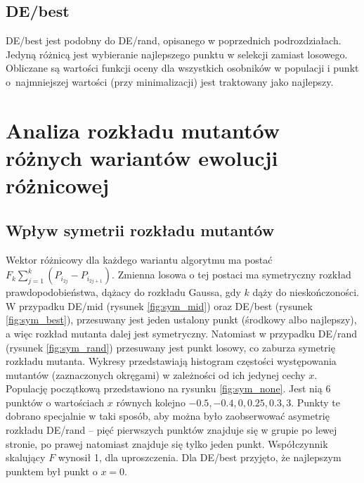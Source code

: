 \documentclass[a4paper,onecolumn,oneside,12pt,wide,floatssmall]{mwrep}
\theoremstyle{definition}
\theoremstyle{plain}%
\theoremstyle{remark}
\begin{document}
\subsection{DE/best}

DE/best jest podobny do DE/rand, opisanego w poprzednich podrozdziałach.
Jedyną różnicą jest wybieranie najlepszego punktu w selekcji zamiast losowego. Obliczane są wartości
funkcji oceny dla wszystkich osobników w populacji i punkt o~najmniejszej wartości (przy minimalizacji)
jest traktowany jako najlepszy.

\section{Analiza rozkładu mutantów różnych wariantów ewolucji różnicowej}

\subsection{Wpływ symetrii rozkładu mutantów}

Wektor różnicowy dla każdego wariantu algorytmu ma postać
$ F_k\sum\limits_{j=1}^k (P_{i_{2j}} - P_{i_{2j+1}}) $. Zmienna losowa o tej postaci
ma symetryczny rozkład prawdopodobieństwa, dążacy do rozkładu Gaussa, gdy $k$ dąży do 
nieskończoności. W przypadku DE/mid (rysunek \ref{fig:sym_mid}) 
oraz DE/best (rysunek \ref{fig:sym_best}),
przesuwany jest jeden ustalony punkt (środkowy albo najlepszy), 
a więc rozkład mutanta dalej jest symetryczny.
Natomiast w przypadku DE/rand (rysunek \ref{fig:sym_rand}) 
przesuwany jest punkt losowy, co zaburza symetrię rozkładu mutanta.
Wykresy przedstawiają histogram częstości występowania
mutantów (zaznaczonych okręgami) w zależności od ich jedynej cechy $x$.
Populację początkową przedstawiono na rysunku \ref{fig:sym_none}.
Jest nią 6 punktów o wartościach $x$ równych kolejno $-0.5, -0.4, 0, 0.25, 0.3, 3$.
Punkty te dobrano specjalnie w taki sposób, aby można było zaobserwować asymetrię
rozkładu DE/rand -- pięć pierwszych punktów znajduje się w grupie po lewej stronie, 
po prawej natomiast znajduje się tylko jeden punkt.
Współczynnik skalujący $F$ wynosił 1, dla uproszczenia.
Dla DE/best przyjęto, że najlepszym punktem był punkt o $x = 0$.
\end{document}
